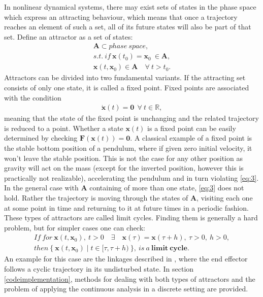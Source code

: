     In nonlinear dynamical systems, there may exist sets of states in the phase space which express an attracting behaviour, which means that once a trajectory reaches an element of such a set, all of its future states will also be part of that set. Define an attractor as a set of states:
    \begin{gather} \mathbf{A} \subset phase\ space,\\ s.t.\ if \ \mathbf{x}(t_0) = \mathbf{x}_0\ \in \mathbf{A}, \\ \mathbf{x}(t,\mathbf{x}_0) \in \mathbf{A}\quad \forall\ t > t_0. \label{eq:2} \end{gather}
    Attractors can be divided into two fundamental variants.
    If the attracting set consists of only one state, it is called a fixed point. Fixed points are associated with the condition
    \begin{gather}  \dot{\mathbf{x}}(t) = \mathbf{0}\ \ \forall \ t \in \mathbb{R}, \label{eq:3} \end{gather}
    meaning that the state of the fixed point is unchanging and the related trajectory is reduced to a point. Whether a state $\mathbf{x}(t)$ is a fixed point can be easily determined by checking $\mathbf{F}(\mathbf{x}(t)) = \mathbf{0} \label{eq:4}$. A classical example of a fixed point is the stable bottom position of a pendulum, where if given zero initial velocity, it won't leave the stable position. This is not the case for any other position as gravity will act on the mass (except for the inverted position, however this is practically not realizable), accelerating the pendulum and in turn violating \ref{eq:3}.
    In the general case with $\mathbf{A}$ containing of more than one state, \ref{eq:3} does not hold. Rather the trajectory is moving through the states of $\mathbf{A}$, visiting each one at some point in time and returning to it at future times in a periodic fashion. These types of attractors are called limit cycles. Finding them is generally a hard problem, but for simpler cases one can check:
    \begin{gather} If\ for \ \mathbf{x}(t,\mathbf{x}_0) ,\ t > 0 \quad \exists \quad \mathbf{x}(\tau) = \mathbf{x}(\tau + h),\ \tau > 0,\ h > 0, \\then\ \{\ \mathbf{x}(t,\mathbf{x}_0) \mid t \in [\tau,\tau + h)\ \}, \ is \ a\ \mathbf{limit\ cycle}.\label{eq:5} \end{gather}
    An example for this case are the linkages described in \cite{jansengait}, where the end effector follows a cyclic trajectory in its undisturbed state. 
    In section \ref{codeimplementation}, methods for dealing with both types of attractors and the problem of applying the continuous analysis in a discrete setting are provided. 

